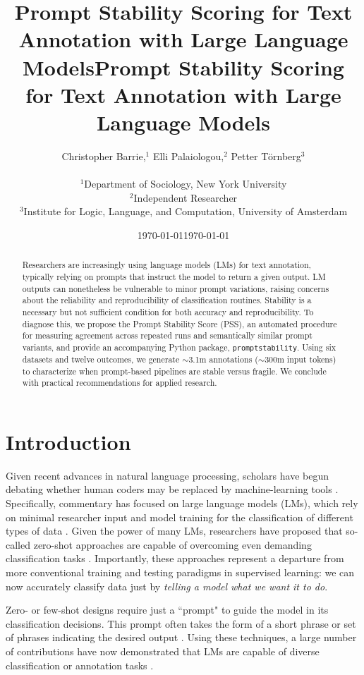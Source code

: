 \documentclass{article}
\title{Prompt Stability Scoring for Text Annotation with Large Language Models}
\author{Christopher Barrie,$^{1}$ Elli Palaiologou,$^{2}$ Petter Törnberg$^{3}$\\
\\
\normalsize{$^{1}$Department of Sociology, New York University}\\
\normalsize{$^{2}$Independent Researcher}\\
\normalsize{$^{3}$Institute for Logic, Language, and Computation, University of Amsterdam}}
\date{\today}
\title{Prompt Stability Scoring for Text Annotation with Large Language Models}
\date{\today}
\begin{document}
\maketitle


\begin{abstract}
\noindent Researchers are increasingly using language models (LMs) for text annotation, typically relying on prompts that instruct the model to return a given output. LM outputs can nonetheless be vulnerable to minor prompt variations, raising concerns about the reliability and reproducibility of classification routines. Stability is a necessary but not sufficient condition for both accuracy and reproducibility. To diagnose this, we propose the Prompt Stability Score (PSS), an automated procedure for measuring agreement across repeated runs and semantically similar prompt variants, and provide an accompanying Python package, \texttt{promptstability}. Using six datasets and twelve outcomes, we generate $\sim$3.1m annotations ($\sim$300m input tokens) to characterize when prompt-based pipelines are stable versus fragile. We conclude with practical recommendations for applied research.

\end{abstract}
\clearpage
\doublespacing
\section{Introduction}

Given recent advances in natural language processing, scholars have begun debating whether human coders may be replaced by machine-learning tools \citep{gilardi2023chatgpt, grossmann2023}. Specifically, commentary has focused on large language models (LMs), which rely on minimal researcher input and model training for the classification of different types of data \citep{ziems2024can, tornberg2023use}. Given the power of many LMs, researchers have proposed that so-called zero-shot approaches are capable of overcoming even demanding classification tasks \citep{le2023uncovering, gilardi2023chatgpt}. Importantly, these approaches represent a departure from more conventional training and testing paradigms in supervised learning: we can now accurately classify data just by \textit{telling a model what we want it to do}.

Zero- or few-shot designs require just a ``prompt" to guide the model in its classification decisions. This prompt often takes the form of a short phrase or set of phrases indicating the desired output \citep{tornberg2023chatgpt}. Using these techniques, a large number of contributions have now demonstrated that LMs are capable of diverse classification or annotation tasks \citep{gilardi2023chatgpt, tornberg2023chatgpt, bang2023multitask, qin2023chatgpt,goyal2022news, chiang2023can, grossmann2023, ziems2024can}.
\end{document}
